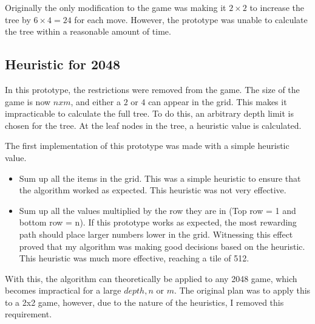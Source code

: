 \documentclass{article}
\begin{document}
Originally the only modification to the game was making it $2 \times 2$ to increase the tree by $6 \times 4 = 24$ for each move. However, the prototype was unable to calculate the tree within a reasonable amount of time.
\subsection{Heuristic for 2048}
\label{subsec:heuristic}
In this prototype, the restrictions were removed from the game. The size of the game is now $n x m$, and either a $2$ or $4$ can appear in the grid. This makes it impracticable to calculate the full tree. To do this, an arbitrary  depth limit is chosen for the tree. At the leaf nodes in the tree, a heuristic value is calculated. 

The first implementation of this prototype was made with a simple heuristic value.
\begin{itemize}
    \item Sum up all the items in the grid. This was a simple heuristic to ensure that the algorithm worked as expected. This heuristic was not very effective.
    \item Sum up all the values multiplied by the row they are in (Top row = 1 and bottom row = n). If this prototype works as expected, the most rewarding path should place larger numbers lower in the grid. Witnessing this effect proved that my algorithm was making good decisions based on the heuristic. This heuristic was much more effective, reaching a tile of 512.
\end{itemize}

With this, the algorithm can theoretically be applied to any 2048 game, which becomes impractical for a large $depth, n$ or $m$. The original plan was to apply this to a 2x2 game, however, due to the nature of the heuristics, I removed this requirement.
\end{document}
